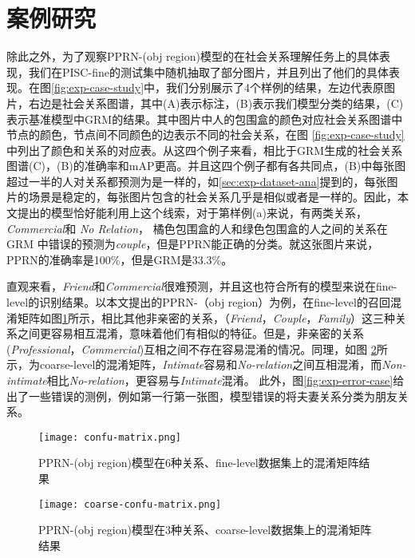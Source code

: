 \section{案例研究}

除此之外，为了观察PPRN-(obj region)模型的在社会关系理解任务上的具体表现，我们在PISC-fine的测试集中随机抽取了部分图片，并且列出了他们的具体表现。在图\ref{fig:exp-case-study}中，我们分别展示了4个样例的结果，左边代表原图片，右边是社会关系图谱，其中(A)表示标注，(B)表示我们模型分类的结果，(C)表示基准模型中GRM的结果。其中图片中人的包围盒的颜色对应社会关系图谱中节点的颜色，节点间不同颜色的边表示不同的社会关系，在图
\ref{fig:exp-case-study}中列出了颜色和关系的对应表。从这四个例子来看，相比于GRM生成的社会关系图谱(C)，(B)的准确率和mAP更高。并且这四个例子都有各共同点，(B)中每张图超过一半的人对关系都预测为是一样的，如\ref{sec:exp-dataset-ana}提到的，每张图片的场景是稳定的，每张图片包含的社会关系几乎是相似或者是一样的。因此，本文提出的模型恰好能利用上这个线索，对于第样例(a)来说，有两类关系，{\it Commercial}和
{\it No Relation}， 橘色包围盒的人和绿色包围盒的人之间的关系在GRM 中错误的预测为{\it couple}，但是PPRN能正确的分类。就这张图片来说，PPRN的准确率是100\%，但是GRM是33.3\%。

直观来看，{\it Friend}和{\it Commercial}很难预测，并且这也符合所有的模型来说在fine-level的识别结果。以本文提出的PPRN-（obj region）为例，在fine-level的召回混淆矩阵如图\ref{fig:exp-confu-fine}所示，相比其他非亲密的关系，（{\it Friend}，{\it Couple}，{\it Family}）这三种关系之间更容易相互混淆，意味着他们有相似的特征。但是，非亲密的关系({\it Professional}，{\it Commercial})互相之间不存在容易混淆的情况。同理，如图
\ref{fig:exp-confu-coarse}所示，为coarse-level的混淆矩阵，{\it Intimate}容易和{\it No-relation}之间互相混淆，而{\it Non-intimate}相比{\it No-relation}，更容易与{\it Intimate}混淆。
此外，图\ref{fig:exp-error-case}给出了一些错误的测例，例如第一行第一张图，模型错误的将夫妻关系分类为朋友关系。
\begin{figure}[htpb]
	\centering
	\texttt{[image: confu-matrix.png]}
    \caption{PPRN-(obj region)模型在6种关系、fine-level数据集上的混淆矩阵结果}
	\vspace*{-3.5mm}
	\label{fig:exp-confu-fine}
\end{figure}
\begin{figure}[htpb]
	\centering
	\texttt{[image: coarse-confu-matrix.png]}
    \caption{PPRN-(obj region)模型在3种关系、coarse-level数据集上的混淆矩阵结果}
	\vspace*{-3.5mm}
	\label{fig:exp-confu-coarse}
\end{figure}


